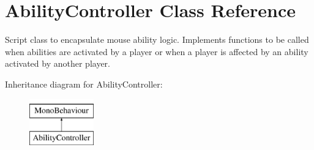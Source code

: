 \hypertarget{class_ability_controller}{}\section{Ability\+Controller Class Reference}
\label{class_ability_controller}


Script class to encapsulate mouse ability logic. Implements functions to be called when abilities are activated by a player or when a player is affected by an ability activated by another player.  


Inheritance diagram for Ability\+Controller\+:\begin{figure}[H]
\begin{center}
\leavevmode
\includegraphics[height=2.000000cm]{class_ability_controller}
\end{center}
\end{figure}
